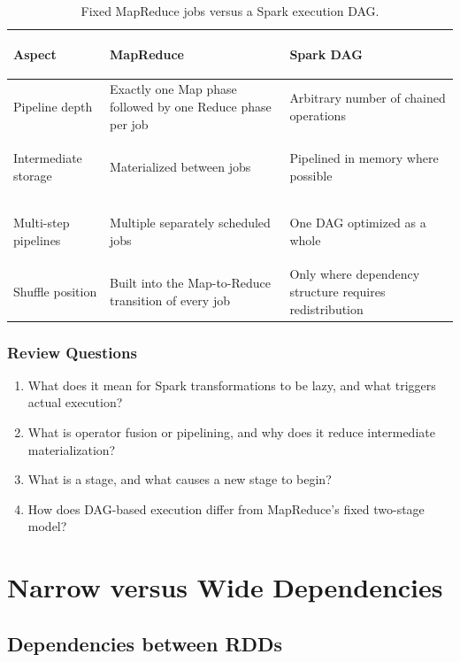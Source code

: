 \documentclass[11pt,a4paper,oneside]{book}
\begin{document}
\begin{table}[htbp]
\centering
\caption{Fixed MapReduce jobs versus a Spark execution DAG.}
\label{tab:mapreduce-vs-spark-dag}
\begin{tabularx}{\textwidth}{>{\bfseries\raggedright\arraybackslash}p{3.4cm} Y Y}
\toprule
{}
Aspect & MapReduce & Spark DAG \\
\midrule
Pipeline depth & Exactly one Map phase followed by one Reduce phase per job & Arbitrary number of chained operations \\
Intermediate storage & Materialized between jobs & Pipelined in memory where possible \\
Multi-step pipelines & Multiple separately scheduled jobs & One DAG optimized as a whole \\
Shuffle position & Built into the Map-to-Reduce transition of every job & Only where dependency structure requires redistribution \\
\bottomrule
\end{tabularx}
\end{table}

\subsubsection*{Review Questions}
\begin{enumerate}
    \item What does it mean for Spark transformations to be lazy, and what triggers actual execution?
    \item What is operator fusion or pipelining, and why does it reduce intermediate materialization?
    \item What is a stage, and what causes a new stage to begin?
    \item How does DAG-based execution differ from MapReduce's fixed two-stage model?
\end{enumerate}

\section{Narrow versus Wide Dependencies}
\label{sec:spark-dependencies}

\subsection{Dependencies between RDDs}
\end{document}

